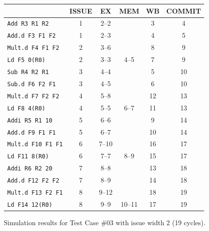 \documentclass[11pt]{article}
\renewcommand{\_}{\origunderscore\allowbreak}
\begin{document}
\begin{figure}[H]
\centering
\small
\begin{tabular}{lccccc}
\hline
 & ISSUE & EX & MEM & WB & COMMIT \\
\hline
\texttt{Add R3 R1 R2} & 1 & 2--2 &  & 3 & 4 \\
\texttt{Add.d F3 F1 F2} & 1 & 2--3 &  & 4 & 5 \\
\texttt{Mult.d F4 F1 F2} & 2 & 3--6 &  & 8 & 9 \\
\texttt{Ld F5 0(R0)} & 2 & 3--3 & 4--5 & 7 & 9 \\
\texttt{Sub R4 R2 R1} & 3 & 4--4 &  & 5 & 10 \\
\texttt{Sub.d F6 F2 F1} & 3 & 4--5 &  & 6 & 10 \\
\texttt{Mult.d F7 F2 F2} & 4 & 5--8 &  & 12 & 13 \\
\texttt{Ld F8 4(R0)} & 4 & 5--5 & 6--7 & 11 & 13 \\
\texttt{Addi R5 R1 10} & 5 & 6--6 &  & 9 & 14 \\
\texttt{Add.d F9 F1 F1} & 5 & 6--7 &  & 10 & 14 \\
\texttt{Mult.d F10 F1 F1} & 6 & 7--10 &  & 16 & 17 \\
\texttt{Ld F11 8(R0)} & 6 & 7--7 & 8--9 & 15 & 17 \\
\texttt{Addi R6 R2 20} & 7 & 8--8 &  & 13 & 18 \\
\texttt{Add.d F12 F2 F2} & 7 & 8--9 &  & 14 & 18 \\
\texttt{Mult.d F13 F2 F1} & 8 & 9--12 &  & 18 & 19 \\
\texttt{Ld F14 12(R0)} & 8 & 9--9 & 10--11 & 17 & 19 \\
\hline
\end{tabular}
\caption{Simulation results for Test Case \#03 with issue width 2 (19 cycles).}
\end{figure}
\end{document}

